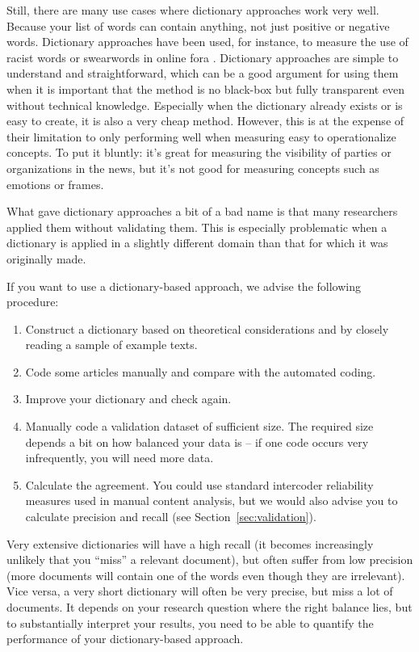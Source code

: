 Still, there are many use cases where dictionary approaches work very
well. Because your list of words can contain anything, not just
positive or negative words. Dictionary approaches have been used, for
instance, to measure the use of racist words or swearwords in online
fora \citep[e.g.,][]{Tulkens2016}. Dictionary approaches are simple to understand and
straightforward, which can be a good argument for using them when it
is important that the method is no black-box but fully transparent
even without technical knowledge. Especially when the dictionary  already
exists or is easy to create, it is also a very cheap method.
However, this is at the expense of their limitation to only performing well when measuring easy to operationalize concepts. To put it bluntly: it's great for measuring the visibility of parties or organizations in the news, but it's not
good for measuring concepts such as emotions or frames.

What gave dictionary approaches a bit of a bad name is that many
researchers applied them without validating them. This is especially
problematic when a dictionary is applied in a slightly different
domain than that for which it was originally made.

If you want to use a dictionary-based approach, we advise the
following procedure:

\begin{enumerate}
  \item Construct a dictionary based on theoretical considerations and by closely reading a sample of example texts.
  \item Code some articles manually and compare with the automated coding.
  \item Improve your dictionary and check again.
  \item Manually code a validation dataset of sufficient size. The required size depends a bit on how balanced your data is -- if one code occurs very infrequently, you will need more data.
  \item Calculate the agreement. You could use standard intercoder reliability measures used in manual content analysis, but we would also advise you to calculate precision and recall (see Section~\ref{sec:validation}).
  \end{enumerate}

Very extensive dictionaries will have a high recall (it becomes
increasingly unlikely that you ``miss'' a relevant document), but
often suffer from low precision (more documents will contain one of
the words even though they are irrelevant). Vice versa, a very short
dictionary will often be very precise, but miss a lot of documents.
It depends on your research question where the right balance lies, but
to substantially interpret your results, you need to be able to
quantify the performance of your dictionary-based approach.


